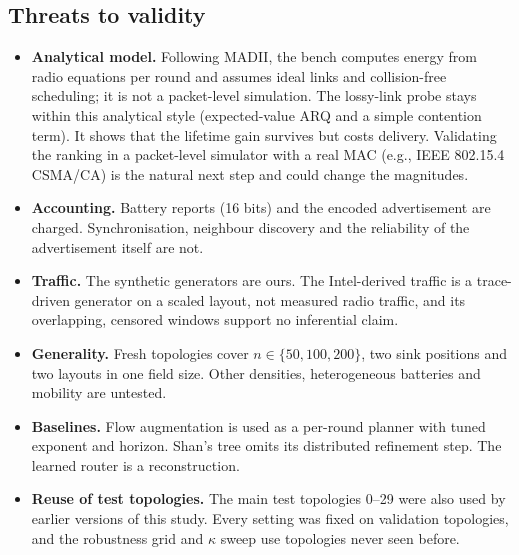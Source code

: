\subsection{Threats to validity}\label{sec:threats}
\begin{itemize}[leftmargin=*]
  \item \textbf{Analytical model.} Following MADII, the bench computes energy from radio equations per round and assumes ideal links and collision-free scheduling; it is not a packet-level simulation. The lossy-link probe stays within this analytical style (expected-value ARQ and a simple contention term). It shows that the lifetime gain survives but costs delivery. Validating the ranking in a packet-level simulator with a real MAC (e.g., IEEE 802.15.4 CSMA/CA) is the natural next step and could change the magnitudes.
  \item \textbf{Accounting.} Battery reports (16 bits) and the encoded advertisement are charged. Synchronisation, neighbour discovery and the reliability of the advertisement itself are not.
  \item \textbf{Traffic.} The synthetic generators are ours. The Intel-derived traffic is a trace-driven generator on a scaled layout, not measured radio traffic, and its overlapping, censored windows support no inferential claim.
  \item \textbf{Generality.} Fresh topologies cover $n\in\{50,100,200\}$, two sink positions and two layouts in one field size. Other densities, heterogeneous batteries and mobility are untested.
  \item \textbf{Baselines.} Flow augmentation is used as a per-round planner with tuned exponent and horizon. Shan's tree omits its distributed refinement step. The learned router is a reconstruction.
  \item \textbf{Reuse of test topologies.} The main test topologies 0--29 were also used by earlier versions of this study. Every setting was fixed on validation topologies, and the robustness grid and $\kappa$ sweep use topologies never seen before.
\end{itemize}
